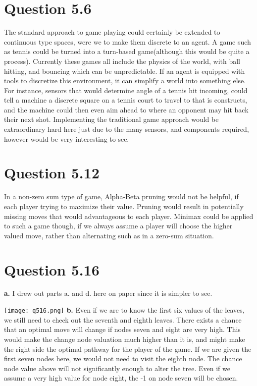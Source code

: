 \documentclass[12pt]{amsart}
\begin{document}
   \section*{Question 5.6}
The standard approach to game playing could certainly be extended to continuous type spaces, were we to make them discrete to an agent. A game such as tennis could be turned into a turn-based game(although this would be quite a process). Currently these games all include the physics of the world, with ball hitting, and bouncing which can be unpredictable. If an agent is equipped with tools to discretize this environment, it can simplify a world into something else. For instance, sensors that would determine angle of a tennis hit incoming, could tell a machine a discrete square on a tennis court to travel to that is constructs, and the machine could then even aim ahead to where an opponent may hit back their next shot. Implementing the traditional game approach would be extraordinary hard here just due to the many sensors, and components required, however would be very interesting to see.
  
      \section*{Question 5.12}
 In a non-zero sum type of game, Alpha-Beta pruning would not be helpful, if each player trying to maximize their value. Pruning would result in potentially missing moves that would advantageous to each player. Minimax could be applied to such a game though, if we always assume a player will choose the higher valued move, rather than alternating such as in a zero-sum situation. 
   
      \section*{Question 5.16}
  \textbf{a.} I drew out parts a. and d. here on paper since it is simpler to see.
  
   \texttt{[image: q516.png]} 
 \textbf{b.}  Even if we are to know the first six values of the leaves, we still need to check out the seventh and eighth leaves. There exists a chance that an optimal move will change if nodes seven and eight are very high. This would make the change node valuation much higher than it is, and might make the right side the optimal pathway for the player of the game. If we are given the first seven nodes here, we would not need to visit the eighth node. The chance node value above will not significantly enough to alter the tree. Even if we assume a very high value for node eight, the -1 on node seven will be chosen.
   \hfill \break
   
\end{document}
